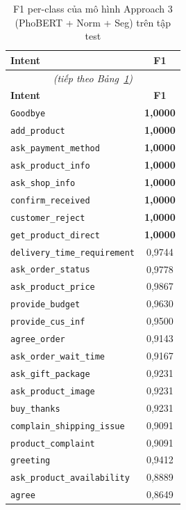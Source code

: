 \documentclass[12pt, a4paper]{report}
\begin{document}
\begin{longtable}{lc}
\caption{F1 per-class của mô hình Approach 3 (PhoBERT + Norm + Seg) trên tập test}
\label{tab:perclass_intent} \\
\toprule
\textbf{Intent} & \textbf{F1} \\
\midrule
\endfirsthead
\multicolumn{2}{c}{\textit{(tiếp theo Bảng~\ref{tab:perclass_intent})}} \\
\toprule
\textbf{Intent} & \textbf{F1} \\
\midrule
\endhead
\bottomrule
\endlastfoot
\texttt{Goodbye}                    & \textbf{1,0000} \\
\texttt{add\_product}               & \textbf{1,0000} \\
\texttt{ask\_payment\_method}       & \textbf{1,0000} \\
\texttt{ask\_product\_info}         & \textbf{1,0000} \\
\texttt{ask\_shop\_info}            & \textbf{1,0000} \\
\texttt{confirm\_received}          & \textbf{1,0000} \\
\texttt{customer\_reject}           & \textbf{1,0000} \\
\texttt{get\_product\_direct}       & \textbf{1,0000} \\
\texttt{delivery\_time\_requirement}& 0,9744 \\
\texttt{ask\_order\_status}         & 0,9778 \\
\texttt{ask\_product\_price}        & 0,9867 \\
\texttt{provide\_budget}            & 0,9630 \\
\texttt{provide\_cus\_inf}          & 0,9500 \\
\texttt{agree\_order}               & 0,9143 \\
\texttt{ask\_order\_wait\_time}     & 0,9167 \\
\texttt{ask\_gift\_package}         & 0,9231 \\
\texttt{ask\_product\_image}        & 0,9231 \\
\texttt{buy\_thanks}                & 0,9231 \\
\texttt{complain\_shipping\_issue}  & 0,9091 \\
\texttt{product\_complaint}         & 0,9091 \\
\texttt{greeting}                   & 0,9412 \\
\texttt{ask\_product\_availability} & 0,8889 \\
\texttt{agree}                      & 0,8649 \\

\end{longtable}
\end{document}
